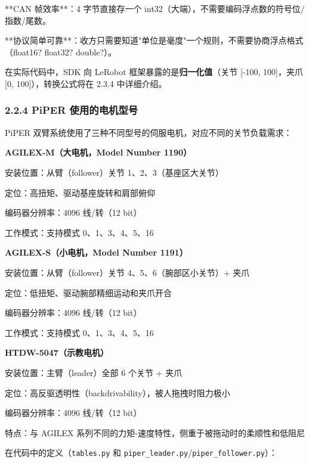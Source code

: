 \documentclass[UTF8,a4paper,11pt]{ctexart}
\begin{document}
\item[2] **CAN 帧效率**：4 字节直接存一个 int32（大端），不需要编码浮点数的符号位/指数/尾数。

\item[3] **协议简单可靠**：收方只需要知道"单位是毫度"一个规则，不需要协商浮点格式（float16? float32? double?）。

在实际代码中，SDK 向 LeRobot 框架暴露的是\textbf{归一化值}（关节 [-100, 100]，夹爪 [0, 100]），转换公式将在 2.3.4 中详细介绍。

\subsubsection{2.2.4 PiPER 使用的电机型号}

PiPER 双臂系统使用了三种不同型号的伺服电机，对应不同的关节负载需求：

\textbf{AGILEX-M（大电机，Model Number 1190）}
\item 安装位置：从臂（follower）关节 1、2、3（基座区大关节）
\item 定位：高扭矩、驱动基座旋转和肩部俯仰
\item 编码器分辨率：4096 线/转（12 bit）
\item 工作模式：支持模式 0、1、3、4、5、16

\textbf{AGILEX-S（小电机，Model Number 1191）}
\item 安装位置：从臂（follower）关节 4、5、6（腕部区小关节）+ 夹爪
\item 定位：低扭矩、驱动腕部精细运动和夹爪开合
\item 编码器分辨率：4096 线/转（12 bit）
\item 工作模式：支持模式 0、1、3、4、5、16

\textbf{HTDW-5047（示教电机）}
\item 安装位置：主臂（leader）全部 6 个关节 + 夹爪
\item 定位：高反驱透明性（backdrivability），被人拖拽时阻力极小
\item 编码器分辨率：4096 线/转（12 bit）
\item 特点：与 AGILEX 系列不同的力矩-速度特性，侧重于被拖动时的柔顺性和低阻尼

在代码中的定义（\texttt{tables.py} 和 \texttt{piper_leader.py}/\texttt{piper_follower.py}）：
\end{document}
